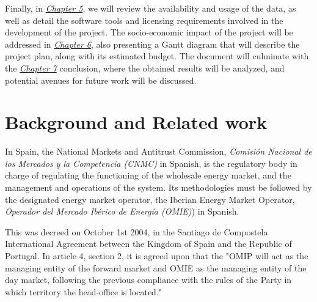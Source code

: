 \documentclass[12pt]{report} %
\begin{document}


Finally, in \textit{\hyperref[chap:05]{Chapter 5}}, we will review the availability and usage of the data, as well as detail the software tools and licensing requirements involved in the development of the project. The socio-economic impact of the project will be addressed in \textit{\hyperref[chap:06]{Chapter 6}}, also presenting a Gantt diagram that will describe the project plan, along with its estimated budget. The document will culminate with the \textit{\hyperref[chap:07]{Chapter 7}} conclusion, where the obtained results will be analyzed, and potential avenues for future work will be discussed.


\chapter{Background and Related work}
\label{chap:02}
In Spain, the National Markets and Antitrust Commission, \textit{Comisión Nacional de los Mercados y la Competencia (CNMC)} in Spanish, is the regulatory body in charge of regulating the functioning of the wholesale energy market, and the management and operations of the system. \cite{boe_cnmc_BOE-A-2019-17287} Its methodologies must be followed by the designated energy market operator, the Iberian Energy Market Operator, \textit{Operador del Mercado Ibérico de Energía (OMIE)}) in Spanish.

This was decreed on October 1st 2004, in the Santiago de Compostela International Agreement between the Kingdom of Spain and the Republic of Portugal. In article 4, section 2, it is agreed upon that the "OMIP will act as the managing entity of the forward market and OMIE as the managing entity of the day market, following the previous compliance with the rules of the Party in which territory the head-office is located." \cite{SantiagoAgreement2004}

\end{document}
